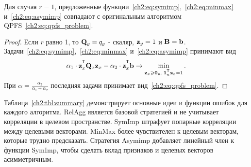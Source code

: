 \begin{statement}
	Для случая $r=1$, предложенные функции~\eqref{ch2:eq:symimp},~\eqref{ch2:eq:minmax} и~\eqref{ch2:eq:asymimp} совпадают с оригинальным алгоритмом QPFS~\eqref{ch2:eq:qpfs_problem}.
	
	\begin{proof}
		Если $r$ равно 1, то $\mathbf{Q}_y = q_y$ - скаляр, $\mathbf{z}_y = 1$ и $\mathbf{B} = \mathbf{b}$. Задачи~\eqref{ch2:eq:symimp},~\eqref{ch2:eq:minmax} и~\eqref{ch2:eq:asymimp} принимают вид
		\begin{equation*}
		\alpha_1 \cdot \bz_x^{\T} \bQ_x \bz_x - \alpha_2 \cdot \bz_x^{\T} \bb \rightarrow \min_{\bz_x \geq \bZero_n, \, \bOne_n^{\T}\bz_x=1} .
		\end{equation*}
		При $\alpha = \frac{\alpha_2}{\alpha_1 + \alpha_2}$ последняя задачи принимает вид~\eqref{ch2:eq:qpfs_problem}.
	\end{proof}
\end{statement}

Таблица~\ref{ch2:tbl:summary} демонстрирует основные идеи и функции ошибок для каждого алгоритма. 
RelAgg является базовой стратегией и не учитывает корреляции в целевом пространстве.
SymImp штрафует попарные корреляции между целевыми векторами.
MinMax более чувствителен к целевым векторам, которые трудно предсказать.
Стратегия Asymimp добавляет линейный член к функции SymImp, чтобы сделать вклад признаков и целевых векторов асимметричным.

